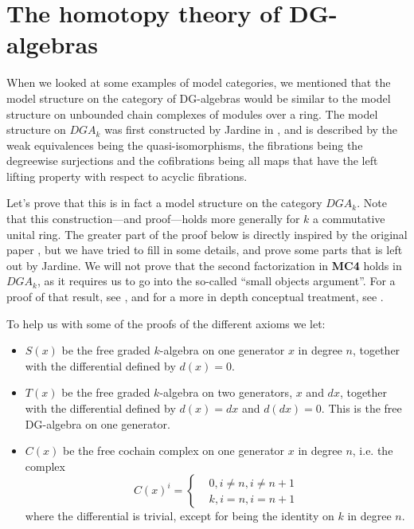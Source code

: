 

\section{The homotopy theory of DG-algebras}

When we looked at some examples of model categories, we mentioned that the model structure on the category of DG-algebras would be similar to the model structure on unbounded chain complexes of modules over a ring. The model structure on $DGA_k$ was first constructed by Jardine in \cite{jardine}, and is described by the weak equivalences being the quasi-isomorphisms, the fibrations being the degreewise surjections and the cofibrations being all maps that have the left lifting property with respect to acyclic fibrations. 

Let's prove that this is in fact a model structure on the category $DGA_k$. Note that this construction---and proof---holds more generally for $k$ a commutative unital ring. The greater part of the proof below is directly inspired by the  original paper \cite{jardine}, but we have tried to fill in some details, and prove some parts that is left out by Jardine. We will not prove that the second factorization in \textbf{MC4} holds in $DGA_k$, as it requires us to go into the so-called ``small objects argument''. For a proof of that result, see \cite[Theorem 2.1.14]{hovey}, and for a more in depth conceptual treatment, see \cite{small_objects}.

To help us with some of the proofs of the different axioms we let:
\begin{itemize}
	\item $S(x)$ be the free graded $k$-algebra on one generator $x$ in degree $n$, together with the differential defined by $d(x)=0$.
	
	\item $T(x)$ be the free graded $k$-algebra on two generators, $x$ and $dx$, together with the differential defined by $d(x)=dx$ and $d(dx)=0$. This is the free DG-algebra on one generator.
	\item $C(x)$ be the free cochain complex on one generator $x$ in degree $n$, i.e. the complex 
\begin{equation*}
    C(x)^i = 
    \begin{cases}
        &  0, i\neq n, i\neq n+1 \\
        & k, i = n, i= n+1
    \end{cases}
\end{equation*}
where the differential is trivial, except for being the identity on $k$ in degree $n$. 
\end{itemize}


